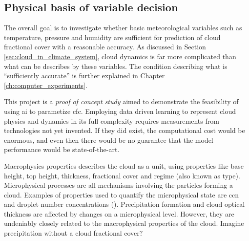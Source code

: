 \subsection{Physical basis of variable decision} \label{sec:ecc}
The overall goal is to investigate whether basic meteorological variables such as temperature, pressure and humidity are sufficient for prediction of cloud fractional cover with a reasonable accuracy. As discussed in Section \ref{sec:cloud_in_climate_system}, cloud dynamics is far more complicated than what can be describes by these variables. 
The condition describing what is ``sufficiently accurate'' is further explained in Chapter \ref{ch:computer_experiments}.

This project is a \textit{proof of concept study} aimed to demonstrate the feasibility of using \acrshort{ai} to parametize \acrshort{cfc}. Employing data driven learning to represent cloud physics and dynamics in its full complexity requires measurements from technologies not yet invented. If they did exist, the computational cost would be enormous, and even then there would be no guarantee that the model performance would be %
state-of-the-art.

Macrophysics properties describes the cloud as a unit, using properties like base height, top height, thickness, fractional cover and regime (also known as type). Microphysical processes are all mechanisms involving the particles forming a cloud. Examples of properties used to quantify the microphysical state
are \acrshort{ccn} and droplet number concentrations (\cite{Grabowski2019ModelingBetter}). Precipitation formation and cloud optical thickness are affected by changes on a microphysical level. However, they are undeniably closely related to the macrophysical properties of the cloud. Imagine precipitation without a cloud fractional cover? 


